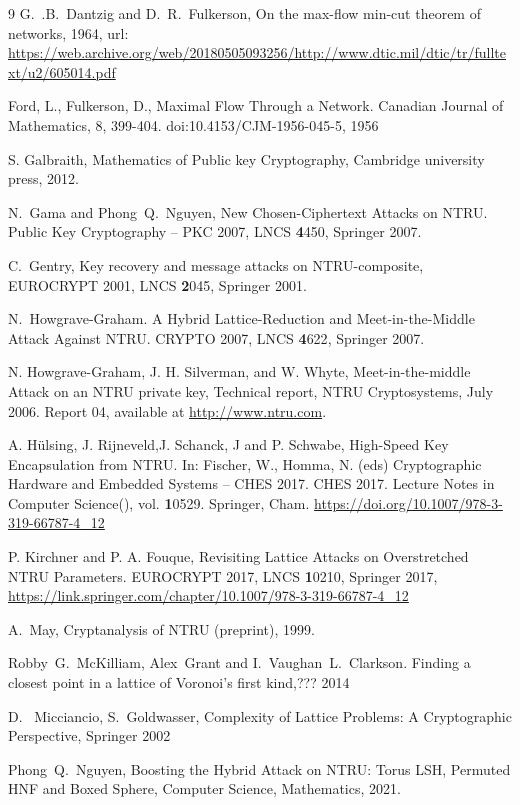 \documentclass{amsart}
\numberwithin{equation}{section}
\begin{document}
\begin{thebibliography}{9}
 G.~.B.~Dantzig and D.~R.~Fulkerson, On the max-flow min-cut theorem of networks, 1964, url: \url{https://web.archive.org/web/20180505093256/http://www.dtic.mil/dtic/tr/fulltext/u2/605014.pdf}

 Ford, L.,  Fulkerson, D., Maximal Flow Through a Network. Canadian Journal of Mathematics, 8, 399-404. doi:10.4153/CJM-1956-045-5, 1956
 
 S. Galbraith, Mathematics of Public key Cryptography, Cambridge university press, 2012.
 
 N.~Gama and Phong~Q.~Nguyen, New Chosen-Ciphertext Attacks on NTRU. Public Key Cryptography – PKC 2007, LNCS {\textbf 4450}, Springer 2007.

 C.~Gentry, Key recovery and message attacks on NTRU-composite, EUROCRYPT 2001, LNCS {\textbf 2045}, Springer 2001.

 N.~Howgrave-Graham. A Hybrid Lattice-Reduction and Meet-in-the-Middle Attack Against NTRU. CRYPTO 2007, LNCS {\textbf 4622}, Springer 2007. 

 N. Howgrave-Graham, J. H. Silverman, and W. Whyte, Meet-in-the-middle Attack on an NTRU private key, Technical report, NTRU Cryptosystems, July 2006. Report  04, available at \url{http://www.ntru.com}.
 
 A. Hülsing, J. Rijneveld,J. Schanck, J and P. Schwabe, High-Speed Key Encapsulation from NTRU. In: Fischer, W., Homma, N. (eds) 
Cryptographic Hardware and Embedded Systems – CHES 2017. CHES 2017. Lecture 
Notes in Computer Science(), vol. {\textbf 10529}. Springer, Cham. \url{https://doi.org/10.1007/978-3-319-66787-4\_12}

 P. Kirchner and P. A. Fouque, Revisiting Lattice Attacks on Overstretched NTRU Parameters. EUROCRYPT 2017, LNCS {\textbf 10210}, Springer 2017, \url{https://link.springer.com/chapter/10.1007/978-3-319-66787-4_12}

  A.~May, Cryptanalysis of NTRU (preprint), 1999.

 Robby~G.~McKilliam, Alex~Grant and I.~Vaughan~L.~Clarkson. Finding a closest point in a lattice of Voronoi's first kind,??? 2014

 D.~ Micciancio, S.~Goldwasser, Complexity of Lattice Problems: A Cryptographic Perspective, Springer 2002

  Phong~Q.~Nguyen, Boosting the Hybrid Attack on NTRU: Torus LSH, Permuted HNF and Boxed Sphere, Computer Science, Mathematics, 2021.


\end{thebibliography}
\end{document}
